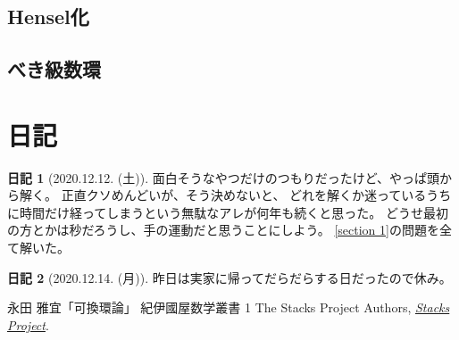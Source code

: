 \documentclass[uplatex]{jsarticle}
\theoremstyle{definition}
\newtheorem*{nikki*}{日記}
\begin{document}
\subsection{Hensel化}
\subsection{べき級数環}







\appendix

\section{日記}

\begin{nikki*}[2020.12.12. (土)]
  面白そうなやつだけのつもりだったけど、やっぱ頭から解く。
  正直クソめんどいが、そう決めないと、
  どれを解くか迷っているうちに時間だけ経ってしまうという無駄なアレが何年も続くと思った。
  どうせ最初の方とかは秒だろうし、手の運動だと思うことにしよう。
  \autoref{section 1}の問題を全て解いた。
\end{nikki*}


\begin{nikki*}[2020.12.14. (月)]
  昨日は実家に帰ってだらだらする日だったので休み。

\end{nikki*}


\begin{thebibliography}{9}
  永田 雅宜「可換環論」
  紀伊國屋数学叢書 1
  The Stacks Project Authors,
  \href{https://stacks.math.columbia.edu/}{\textit{Stacks Project}}.
\end{thebibliography}
\end{document}
